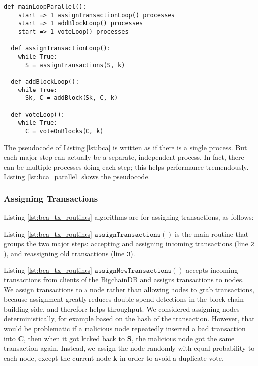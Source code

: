 \begin{minipage}{\linewidth}
  \begin{lstlisting}[caption={Parallel version of BigchainDB Consensus Algorithm.}, label={lst:bca_parallel}, style=python]
  def mainLoopParallel():
    start => 1 assignTransactionLoop() processes 
    start => 1 addBlockLoop() processes 
    start => 1 voteLoop() processes
    
  def assignTransactionLoop():
    while True:
      S = assignTransactions(S, k)
  
  def addBlockLoop():
    while True:
      Sk, C = addBlock(Sk, C, k)
  
  def voteLoop():
    while True:
      C = voteOnBlocks(C, k)
  \end{lstlisting}
\end{minipage}

The pseudocode of Listing \ref{lst:bca} is written as if there is a single process.
But each major step can actually be a separate, independent process.
In fact, there can be multiple processes doing each step; this helps performance tremendously.
Listing \ref{lst:bca_parallel} shows the pseudocode.

\subsubsection{Assigning Transactions}

\medskip
\noindent Listing \ref{lst:bca_tx_routines} algorithms are for assigning transactions, as follows:

Listing \ref{lst:bca_tx_routines} $\mathtt{assignTransactions()}$ is the main routine that groups the two major steps: accepting and assigning incoming transactions (line $\mathtt{2}$), and reassigning old transactions (line $\mathtt{3}$).

Listing \ref{lst:bca_tx_routines} $\mathtt{assignNewTransactions()}$ accepts incoming transactions from clients of the BigchainDB and assigns transactions to nodes.
We assign transactions to a node rather than allowing nodes to grab transactions, because assignment greatly reduces double-spend detections in the block chain building side, and therefore helps throughput.
We considered assigning nodes deterministically, for example based on the hash of the transaction.
However, that would be problematic if a malicious node repeatedly inserted a bad transaction into $\mathbf{C}$, then when it got kicked back to $\mathbf{S}$, the malicious node got the same transaction again.
Instead, we assign the node randomly with equal probability to each node, except the current node $\mathbf{k}$ in order to avoid a duplicate vote.

